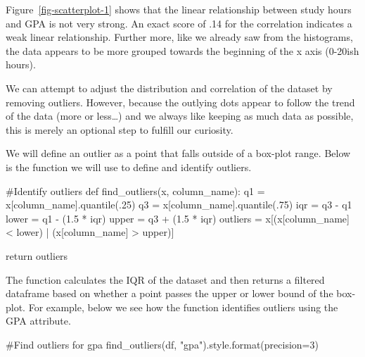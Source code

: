 \documentclass[
  letterpaper,
  DIV=11,
  numbers=noendperiod]{scrreprt}
\newenvironment{Shaded}{\begin{snugshade}}{\end{snugshade}}
\newcommand{\BuiltInTok}[1]{\textcolor[rgb]{0.00,0.23,0.31}{#1}}
\newcommand{\CommentTok}[1]{\textcolor[rgb]{0.37,0.37,0.37}{#1}}
\newcommand{\ControlFlowTok}[1]{\textcolor[rgb]{0.00,0.23,0.31}{#1}}
\newcommand{\DecValTok}[1]{\textcolor[rgb]{0.68,0.00,0.00}{#1}}
\newcommand{\FloatTok}[1]{\textcolor[rgb]{0.68,0.00,0.00}{#1}}
\newcommand{\KeywordTok}[1]{\textcolor[rgb]{0.00,0.23,0.31}{#1}}
\newcommand{\NormalTok}[1]{\textcolor[rgb]{0.00,0.23,0.31}{#1}}
\newcommand{\OperatorTok}[1]{\textcolor[rgb]{0.37,0.37,0.37}{#1}}
\newcommand{\StringTok}[1]{\textcolor[rgb]{0.13,0.47,0.30}{#1}}
\begin{document}
Figure~\ref{fig-scatterplot-1} shows that the linear relationship
between study hours and GPA is not very strong. An exact score of .14
for the correlation indicates a weak linear relationship. Further more,
like we already saw from the histograms, the data appears to be more
grouped towards the beginning of the x axis (0-20ish hours).

We can attempt to adjust the distribution and correlation of the dataset
by removing outliers. However, because the outlying dots appear to
follow the trend of the data (more or less\ldots) and we always like
keeping as much data as possible, this is merely an optional step to
fulfill our curiosity.

We will define an outlier as a point that falls outside of a box-plot
range. Below is the function we will use to define and identify
outliers.

\begin{Shaded}
\begin{Highlighting}[]
\CommentTok{\#Identify outliers}
\KeywordTok{def}\NormalTok{ find\_outliers(x, column\_name):}
\NormalTok{    q1 }\OperatorTok{=}\NormalTok{ x[column\_name].quantile(}\FloatTok{.25}\NormalTok{)}
\NormalTok{    q3 }\OperatorTok{=}\NormalTok{ x[column\_name].quantile(}\FloatTok{.75}\NormalTok{)}
\NormalTok{    iqr }\OperatorTok{=}\NormalTok{ q3 }\OperatorTok{{-}}\NormalTok{ q1}
\NormalTok{    lower }\OperatorTok{=}\NormalTok{ q1 }\OperatorTok{{-}}\NormalTok{ (}\FloatTok{1.5} \OperatorTok{*}\NormalTok{ iqr)}
\NormalTok{    upper }\OperatorTok{=}\NormalTok{ q3 }\OperatorTok{+}\NormalTok{ (}\FloatTok{1.5} \OperatorTok{*}\NormalTok{ iqr)}
\NormalTok{    outliers }\OperatorTok{=}\NormalTok{ x[(x[column\_name] }\OperatorTok{\textless{}}\NormalTok{ lower) }\OperatorTok{|}\NormalTok{ (x[column\_name] }\OperatorTok{\textgreater{}}\NormalTok{ upper)]}
    
    \ControlFlowTok{return}\NormalTok{ outliers}
    
\end{Highlighting}
\end{Shaded}

The function calculates the IQR of the dataset and then returns a
filtered dataframe based on whether a point passes the upper or lower
bound of the box-plot. For example, below we see how the function
identifies outliers using the GPA attribute.

\begin{Shaded}
\begin{Highlighting}[]
\CommentTok{\#Find outliers for gpa}
\NormalTok{find\_outliers(df, }\StringTok{"gpa"}\NormalTok{).style.}\BuiltInTok{format}\NormalTok{(precision}\OperatorTok{=}\DecValTok{3}\NormalTok{)}
\end{Highlighting}
\end{Shaded}
\end{document}
